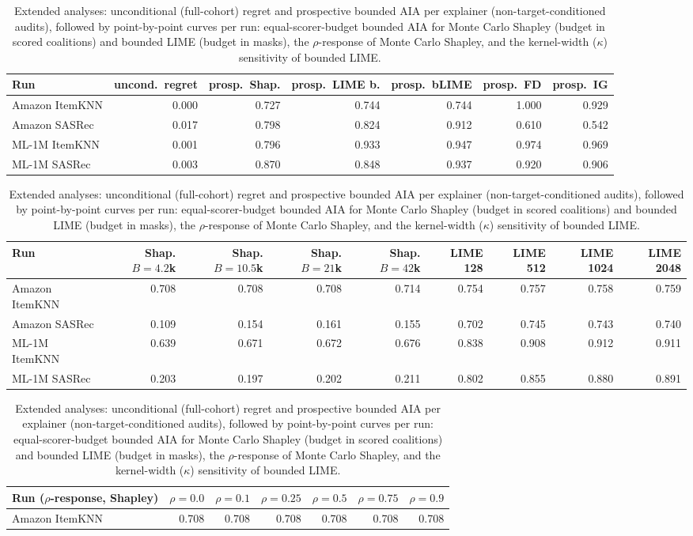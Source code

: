 \begin{table}[!htbp]\centering\scriptsize\setlength{\tabcolsep}{2.5pt}
\caption{Extended analyses: unconditional (full-cohort) regret and
prospective bounded AIA per explainer (non-target-conditioned audits),
followed by point-by-point curves per run: equal-scorer-budget bounded AIA
for Monte Carlo Shapley (budget in scored coalitions) and bounded LIME
(budget in masks), the $\rho$-response of Monte Carlo Shapley, and the
kernel-width ($\kappa$) sensitivity of bounded LIME.}
\label{tab:review3-ext}
\begin{tabular}{@{}lrrrrrr@{}}
\toprule
Run & uncond.\ regret & prosp.\ Shap. & prosp.\ LIME b. & prosp.\ bLIME & prosp.\ FD & prosp.\ IG \\
\midrule
Amazon ItemKNN & 0.000 & 0.727 & 0.744 & 0.744 & 1.000 & 0.929 \\
Amazon SASRec & 0.017 & 0.798 & 0.824 & 0.912 & 0.610 & 0.542 \\
ML-1M ItemKNN & 0.001 & 0.796 & 0.933 & 0.947 & 0.974 & 0.969 \\
ML-1M SASRec & 0.003 & 0.870 & 0.848 & 0.937 & 0.920 & 0.906 \\
\bottomrule
\end{tabular}
\par\vspace{2mm}
\begin{tabular}{@{}lrrrrrrrr@{}}
\toprule
Run & Shap. $B{=}4.2$k & Shap. $B{=}10.5$k & Shap. $B{=}21$k & Shap. $B{=}42$k & LIME 128 & LIME 512 & LIME 1024 & LIME 2048 \\
\midrule
Amazon ItemKNN & 0.708 & 0.708 & 0.708 & 0.714 & 0.754 & 0.757 & 0.758 & 0.759 \\
Amazon SASRec & 0.109 & 0.154 & 0.161 & 0.155 & 0.702 & 0.745 & 0.743 & 0.740 \\
ML-1M ItemKNN & 0.639 & 0.671 & 0.672 & 0.676 & 0.838 & 0.908 & 0.912 & 0.911 \\
ML-1M SASRec & 0.203 & 0.197 & 0.202 & 0.211 & 0.802 & 0.855 & 0.880 & 0.891 \\
\bottomrule
\end{tabular}
\par\vspace{2mm}
\begin{tabular}{@{}lrrrrrr@{}}
\toprule
Run ($\rho$-response, Shapley) & $\rho=0.0$ & $\rho=0.1$ & $\rho=0.25$ & $\rho=0.5$ & $\rho=0.75$ & $\rho=0.9$ \\
\midrule
Amazon ItemKNN & 0.708 & 0.708 & 0.708 & 0.708 & 0.708 & 0.708 \\

\end{tabular}
\end{table}
